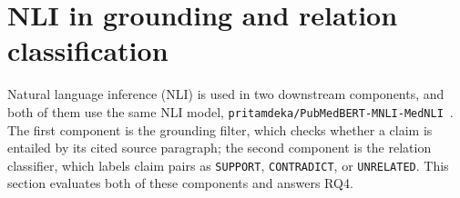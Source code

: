 \section{NLI in grounding and relation classification}\label{section:results-nli-in-grounding-and-relation-classification}

Natural language inference (NLI) is used in two downstream components, and both of them use the same NLI model, \texttt{pritamdeka/PubMedBERT-MNLI-MedNLI}~\parencite{deka2023pubmedbertextended, gu2021biomedbert, williams2018mnli, romanov2018mednli}. The first component is the grounding filter, which checks whether a claim is entailed by its cited source paragraph; the second component is the relation classifier, which labels claim pairs as \texttt{SUPPORT}, \texttt{CONTRADICT}, or \texttt{UNRELATED}. This section evaluates both of these components and answers RQ4.

